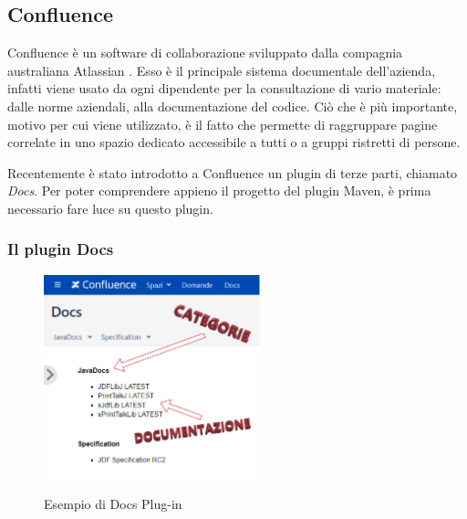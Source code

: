 

    \subsection{Confluence}
    Confluence è un software di collaborazione sviluppato dalla compagnia australiana Atlassian \cite{site:confluence}.
    Esso è il principale sistema documentale dell'azienda, infatti viene usato da ogni dipendente per la consultazione di vario materiale: dalle norme aziendali, alla documentazione del codice.
    Ciò che è più importante, motivo per cui viene utilizzato, è il fatto che permette di raggruppare pagine correlate in uno spazio dedicato accessibile a tutti o a gruppi ristretti di persone.
    
    Recentemente è stato introdotto a Confluence un plugin di terze parti, chiamato \emph{Docs}. 
    Per poter comprendere appieno il progetto del plugin Maven, è prima necessario fare luce su questo plugin.

    \subsubsection{Il plugin Docs} \label{pluginDocs}

    \begin{figure}[H]
        \centering
        \includegraphics[width=0.56\textwidth]{immagini/docs-conf.png}\\
        \caption{Esempio di Docs Plug-in}
        \label{screenDocs}
    \end{figure}


